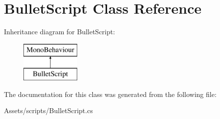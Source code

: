 \hypertarget{class_bullet_script}{}\section{Bullet\+Script Class Reference}
\label{class_bullet_script}
Inheritance diagram for Bullet\+Script\+:\begin{figure}[H]
\begin{center}
\leavevmode
\includegraphics[height=2.000000cm]{class_bullet_script}
\end{center}
\end{figure}


The documentation for this class was generated from the following file\+:\begin{DoxyCompactItemize}
\item 
Assets/scripts/Bullet\+Script.\+cs\end{DoxyCompactItemize}
